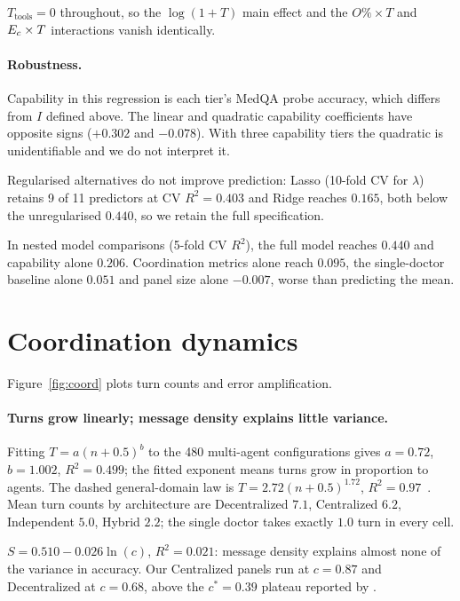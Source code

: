$T_{\text{tools}} = 0$ throughout, so the $\log(1+T)$ main effect and the
$O\%\times T$ and $E_{c}\times T$ interactions vanish identically.

\paragraph{Robustness.}
Capability in this regression is each tier's MedQA probe accuracy, which differs from $I$ defined above.
The linear and quadratic capability coefficients have opposite signs ($+0.302$ and $-0.078$).
With three capability tiers the quadratic is unidentifiable and we do not interpret it.

Regularised alternatives do not improve prediction: Lasso (10-fold CV for $\lambda$) retains 9 of 11
predictors at CV $R^2 = 0.403$ and Ridge reaches $0.165$, both below the unregularised $0.440$, so
we retain the full specification.

In nested model comparisons (5-fold CV $R^2$), the full model reaches $0.440$ and capability alone $0.206$.
Coordination metrics alone reach $0.095$, the single-doctor baseline alone $0.051$ and
panel size alone $-0.007$, worse than predicting the mean.

\section{Coordination dynamics}
\label{app:coord}


Figure~\ref{fig:coord} plots turn counts and error amplification.

\paragraph{Turns grow linearly; message density explains little variance.}
Fitting $T = a(n+0.5)^{b}$ to the 480 multi-agent configurations gives $a = 0.72$, $b = 1.002$, $R^2 = 0.499$; the fitted exponent means turns grow in proportion to agents.
The dashed general-domain law is $T = 2.72(n+0.5)^{1.72}$, $R^2 = 0.97$~\citep{kim2026scaling}.
Mean turn counts by architecture are Decentralized $7.1$, Centralized $6.2$, Independent $5.0$,
Hybrid $2.2$; the single doctor takes exactly $1.0$ turn in every cell.


$S = 0.510 - 0.026\ln(c)$, $R^2 = 0.021$: message density explains almost none of the variance in
accuracy. Our Centralized panels run at $c = 0.87$ and Decentralized at $c = 0.68$, above the
$c^{*} = 0.39$ plateau reported by \citet{kim2026scaling}.

